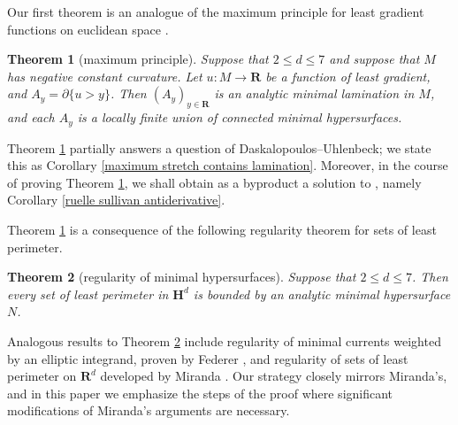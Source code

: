\documentclass[reqno,12pt,letterpaper]{amsart}
\newcommand{\RR}{\mathbf{R}}
\newcommand{\Hyp}{\mathbf H}
\newtheorem{theorem}{Theorem}[section]
\theoremstyle{definition}
\numberwithin{equation}{section}
\begin{document}
Our first theorem is an analogue of the maximum principle for least gradient functions on euclidean space \cite[Proposition 3.4]{górny2017planar}.

\begin{theorem}[maximum principle]\label{main thm}
Suppose that $2 \leq d \leq 7$ and suppose that $M$ has negative constant curvature.
Let $u: M \to \RR$ be a function of least gradient, and $A_y = \partial \{u > y\}$.
Then $(A_y)_{y \in \RR}$ is an analytic minimal lamination in $M$, and each $A_y$ is a locally finite union of connected minimal hypersurfaces.
\end{theorem}

Theorem \ref{main thm} partially answers a question \cite[Problem 9.5]{daskalopoulos2020transverse} of Daskalopoulos--Uhlenbeck; we state this as Corollary \ref{maximum stretch contains lamination}.
Moreover, in the course of proving Theorem \ref{main thm}, we shall obtain as a byproduct a solution to \cite[Problem 9.7]{daskalopoulos2020transverse}, namely Corollary \ref{ruelle sullivan antiderivative}.

Theorem \ref{main thm} is a consequence of the following regularity theorem for sets of least perimeter.

\begin{theorem}[regularity of minimal hypersurfaces]\label{main lma}
Suppose that $2 \leq d \leq 7$.
Then every set of least perimeter in $\Hyp^d$ is bounded by an analytic minimal hypersurface $N$.
\end{theorem}

Analogous results to Theorem \ref{main lma} include regularity of minimal currents weighted by an elliptic integrand, proven by Federer \cite[\S5.3]{federer2014geometric}, and regularity of sets of least perimeter on $\RR^d$ developed by Miranda \cite{Miranda64, Miranda66, Miranda67}.
Our strategy closely mirrors Miranda's, and in this paper we emphasize the steps of the proof where significant modifications of Miranda's arguments are necessary.
\end{document}
